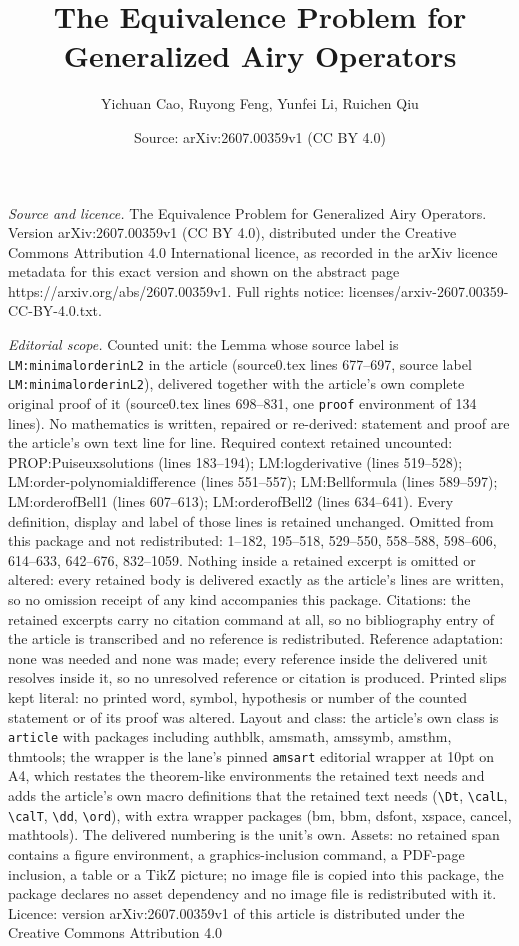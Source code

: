 \documentclass[10pt,a4paper]{amsart}
\title[The Equivalence Problem for Generalized Airy Operators]{The Equivalence Problem for Generalized Airy Operators}
\author{Yichuan Cao, Ruyong Feng, Yunfei Li, Ruichen Qiu}
\date{Source: arXiv:2607.00359v1 (CC BY 4.0)}
\begin{document}
\maketitle

\noindent\emph{Source and licence.} The Equivalence Problem for Generalized Airy Operators. Version arXiv:2607.00359v1 (CC BY 4.0), distributed under the Creative Commons Attribution 4.0 International licence, as recorded in the arXiv licence metadata for this exact version and shown on the abstract page https://arxiv.org/abs/2607.00359v1. Full rights notice: licenses/arxiv-2607.00359-CC-BY-4.0.txt.\par\smallskip

\noindent\textit{Editorial scope.} Counted unit: the Lemma whose source label is \texttt{LM:minimalorderinL2} in the article (source0.tex lines 677--697, source label \texttt{LM:minimalorderinL2}), delivered together with the article's own complete original proof of it (source0.tex lines 698--831, one \texttt{proof} environment of 134 lines). No mathematics is written, repaired or re-derived: statement and proof are the article's own text line for line. Required context retained uncounted: PROP:Puiseuxsolutions (lines 183--194); LM:logderivative (lines 519--528); LM:order-polynomialdifference (lines 551--557); LM:Bellformula (lines 589--597); LM:orderofBell1 (lines 607--613); LM:orderofBell2 (lines 634--641). Every definition, display and label of those lines is retained unchanged. Omitted from this package and not redistributed: 1--182, 195--518, 529--550, 558--588, 598--606, 614--633, 642--676, 832--1059. Nothing inside a retained excerpt is omitted or altered: every retained body is delivered exactly as the article's lines are written, so no omission receipt of any kind accompanies this package. Citations: the retained excerpts carry no citation command at all, so no bibliography entry of the article is transcribed and no reference is redistributed. Reference adaptation: none was needed and none was made; every reference inside the delivered unit resolves inside it, so no unresolved reference or citation is produced. Printed slips kept literal: no printed word, symbol, hypothesis or number of the counted statement or of its proof was altered. Layout and class: the article's own class is \texttt{article} with packages including authblk, amsmath, amssymb, amsthm, thmtools; the wrapper is the lane's pinned \texttt{amsart} editorial wrapper at 10pt on A4, which restates the theorem-like environments the retained text needs and adds the article's own macro definitions that the retained text needs (\texttt{\textbackslash Dt}, \texttt{\textbackslash calL}, \texttt{\textbackslash calT}, \texttt{\textbackslash dd}, \texttt{\textbackslash ord}), with extra wrapper packages (bm, bbm, dsfont, xspace, cancel, mathtools). The delivered numbering is the unit's own. Assets: no retained span contains a figure environment, a graphics-inclusion command, a PDF-page inclusion, a table or a TikZ picture; no image file is copied into this package, the package declares no asset dependency and no image file is redistributed with it. Licence: version arXiv:2607.00359v1 of this article is distributed under the Creative Commons Attribution 4.0 
\end{document}
